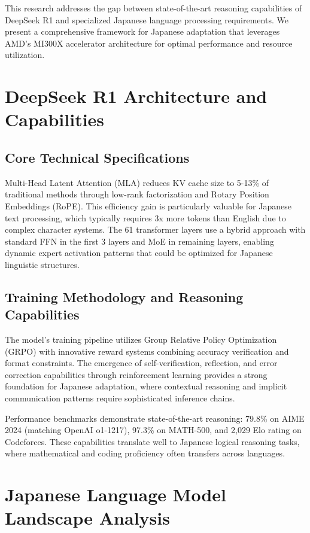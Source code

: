 \documentclass[11pt,a4paper]{article}
\begin{document}
This research addresses the gap between state-of-the-art reasoning capabilities of DeepSeek R1 and specialized Japanese language processing requirements. We present a comprehensive framework for Japanese adaptation that leverages AMD's MI300X accelerator architecture for optimal performance and resource utilization.

\section{DeepSeek R1 Architecture and Capabilities}

\subsection{Core Technical Specifications}

Multi-Head Latent Attention (MLA) reduces KV cache size to 5-13\% of traditional methods through low-rank factorization and Rotary Position Embeddings (RoPE). This efficiency gain is particularly valuable for Japanese text processing, which typically requires 3x more tokens than English due to complex character systems. The 61 transformer layers use a hybrid approach with standard FFN in the first 3 layers and MoE in remaining layers, enabling dynamic expert activation patterns that could be optimized for Japanese linguistic structures.

\subsection{Training Methodology and Reasoning Capabilities}

The model's training pipeline utilizes Group Relative Policy Optimization (GRPO) with innovative reward systems combining accuracy verification and format constraints. The emergence of self-verification, reflection, and error correction capabilities through reinforcement learning provides a strong foundation for Japanese adaptation, where contextual reasoning and implicit communication patterns require sophisticated inference chains.

Performance benchmarks demonstrate state-of-the-art reasoning: 79.8\% on AIME 2024 (matching OpenAI o1-1217), 97.3\% on MATH-500, and 2,029 Elo rating on Codeforces. These capabilities translate well to Japanese logical reasoning tasks, where mathematical and coding proficiency often transfers across languages.

\section{Japanese Language Model Landscape Analysis}
\end{document}
